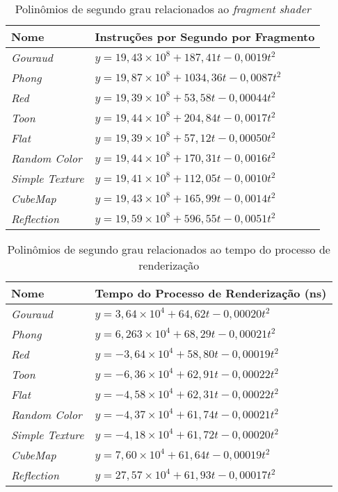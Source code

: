 	\begin{table}[ht]
	\centering	
	\begin{tabularx}{0.9\textwidth}{lX}
		\toprule
		\textbf{Nome} & \textbf{Instruções por Segundo por Fragmento}  \\
		\midrule
		\textit{Gouraud} & $y = 19,43 \times 10 ^8 + 187,41t - 0,0019t^2$  \\
		\textit{Phong}& $y = 19,87 \times 10^8 + 1034,36t - 0,0087t^2$ \\
		\textit{Red} & $y = 19,39 \times 10 ^8 + 53,58t - 0,00044t^2 $\\
		\textit{Toon}& $y = 19,44 \times 10 ^8 + 204,84t - 0,0017t^2 $\\
		\textit{Flat} & $y = 19,39 \times 10 ^8 + 57,12t - 0,00050t^2$ \\
		\textit{Random Color} & $y = 19,44 \times 10 ^8 + 170,31t - 0,0016t^2$\\
		\textit{Simple Texture} & $y = 19,41 \times 10 ^8 + 112,05t - 0,0010t^2$\\
		\textit{CubeMap} & $y = 19,43 \times 10 ^8 + 165,99t - 0,0014t^2$ \\
		\textit{Reflection} & $y = 19,59 \times 10 ^8 + 596,55t - 0,0051t^2$ \\
	
		\bottomrule
	\end{tabularx}
	\caption{Polinômios de segundo grau relacionados ao \textit{fragment shader}}
	\label{equacoessec}
	\end{table}

		\begin{table}[ht]
	\centering	
	\begin{tabularx}{0.9\textwidth}{lX}
		\toprule
		\textbf{Nome} & \textbf{Tempo do Processo de Renderização (ns)}  \\
		\midrule
		\textit{Gouraud} &  $y = 3,64 \times 10^4 + 64,62t - 0,00020t^2$\\
		\textit{Phong} &   $y = 6,263 \times 10^4 + 68,29t - 0,00021t^2$\\
		\textit{Red} & $y = -3,64 \times 10^4 + 58,80t - 0,00019t^2$\\
		\textit{Toon} & $y = -6,36 \times 10^4 + 62,91t - 0,00022t^2$\\
		\textit{Flat} & $y = -4,58 \times 10^4 + 62,31t - 0,00022t^2$\\
		\textit{Random Color} & $y = -4,37 \times 10^4 + 61,74t - 0,00021t^2$\\
		\textit{Simple Texture} & $y = -4,18 \times 10^4 + 61,72t - 0,00020t^2$\\
		\textit{CubeMap} & $y = 7,60 \times 10^4 + 61,64t - 0,00019t^2$\\
		\textit{Reflection} & $y = 27,57 \times 10^4 + 61,93t - 0,00017t^2$ \\
		
		\bottomrule
	\end{tabularx}
	\caption{Polinômios de segundo grau relacionados ao tempo do processo de renderização}
	\label{eqrendersec}
	\end{table}


